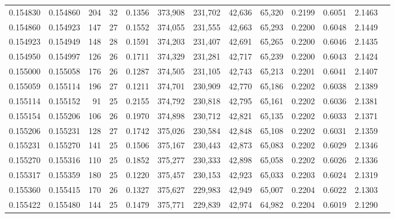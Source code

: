 \begin{tabular}{rrrrrrrrrrrrr}
0.154830 & 0.154860 & 204 &  32 &                                     0.1356 & 373,908 & 231,702 &  42,636 &  65,320 & 0.2199 & 0.6051 & 2.1463 \\
0.154860 & 0.154923 & 147 &  27 &                                     0.1552 & 374,055 & 231,555 &  42,663 &  65,293 & 0.2200 & 0.6048 & 2.1449 \\
0.154923 & 0.154949 & 148 &  28 &                                     0.1591 & 374,203 & 231,407 &  42,691 &  65,265 & 0.2200 & 0.6046 & 2.1435 \\
0.154950 & 0.154997 & 126 &  26 &                                     0.1711 & 374,329 & 231,281 &  42,717 &  65,239 & 0.2200 & 0.6043 & 2.1424 \\
0.155000 & 0.155058 & 176 &  26 &                                     0.1287 & 374,505 & 231,105 &  42,743 &  65,213 & 0.2201 & 0.6041 & 2.1407 \\
0.155059 & 0.155114 & 196 &  27 &                                     0.1211 & 374,701 & 230,909 &  42,770 &  65,186 & 0.2202 & 0.6038 & 2.1389 \\
0.155114 & 0.155152 &  91 &  25 &                                     0.2155 & 374,792 & 230,818 &  42,795 &  65,161 & 0.2202 & 0.6036 & 2.1381 \\
0.155154 & 0.155206 & 106 &  26 &                                     0.1970 & 374,898 & 230,712 &  42,821 &  65,135 & 0.2202 & 0.6033 & 2.1371 \\
0.155206 & 0.155231 & 128 &  27 &                                     0.1742 & 375,026 & 230,584 &  42,848 &  65,108 & 0.2202 & 0.6031 & 2.1359 \\
0.155231 & 0.155270 & 141 &  25 &                                     0.1506 & 375,167 & 230,443 &  42,873 &  65,083 & 0.2202 & 0.6029 & 2.1346 \\
0.155270 & 0.155316 & 110 &  25 &                                     0.1852 & 375,277 & 230,333 &  42,898 &  65,058 & 0.2202 & 0.6026 & 2.1336 \\
0.155317 & 0.155359 & 180 &  25 &                                     0.1220 & 375,457 & 230,153 &  42,923 &  65,033 & 0.2203 & 0.6024 & 2.1319 \\
0.155360 & 0.155415 & 170 &  26 &                                     0.1327 & 375,627 & 229,983 &  42,949 &  65,007 & 0.2204 & 0.6022 & 2.1303 \\
0.155422 & 0.155480 & 144 &  25 &                                     0.1479 & 375,771 & 229,839 &  42,974 &  64,982 & 0.2204 & 0.6019 & 2.1290 \\

\end{tabular}
